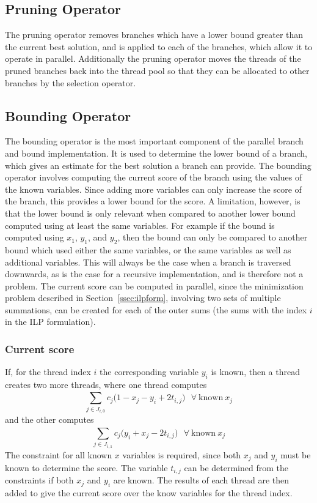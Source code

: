 \documentclass[10pt,twocolumn]{article}
\begin{document}
\subsection{Pruning Operator}

The pruning operator removes branches which have a lower bound greater than the current best
solution, and is applied to each of the branches, which allow it to operate in parallel. Additionally the 
pruning operator moves the threads of the pruned branches back into the thread pool so that they can be
allocated to other branches by the selection operator.

\subsection{Bounding Operator} \label{sec:bounding}

The bounding operator is the most important component of the parallel branch and bound implementation. It is
used to determine the lower bound of a branch, which gives an estimate for the best solution a branch can
provide. 
The bounding operator involves computing the current score of the branch using the values of the
known variables. Since adding more variables can only increase the score of the branch, this provides a lower
bound for the score. A limitation, however, is that the lower bound is only relevant when compared to
another lower bound computed using at least the same variables. For example if the bound is computed using
$x_1$, $y_1$, and $y_2$, then the bound can only be compared to another bound which used either the same variables,
or the same variables as well as additional variables. This will always be the case when a branch is traversed
downwards, as is the case for a recursive implementation, and is therefore not a problem. The current score 
can be computed in parallel, since the minimization 
problem described in Section~\ref{ssec:ilpform}, involving two sets of multiple summations, can be created for
each of the outer sums (the sums with the index $i$ in the ILP formulation). 

\subsubsection{Current score}
If, for the thread index $i$ the corresponding variable $y_i$ is known, then a thread creates two more 
threads, where one thread computes 
\begin{equation*}
    \sum_{j \in J_{i,0}}^{}{c_j(1 - x_j - y_i + 2t_{i,j}})  \ \ \ \forall \ \textrm{known} \ x_j
\end{equation*}
and the other computes
\begin{equation*}
    \sum_{j \in J_{i,1}}^{}{c_j(y_i + x_j - 2t_{i,j}})  \ \ \ \forall \ \textrm{known} \ x_j
\end{equation*}
The constraint for all known $x$ variables is required, since both $x_j$ and $y_i$ must be known to determine
the score. The variable $t_{i,j}$ can be determined from the constraints if both $x_j$ and $y_i$ are known.
The results of each thread are then added to give the current score over the know variables for the thread
index.
\end{document}
